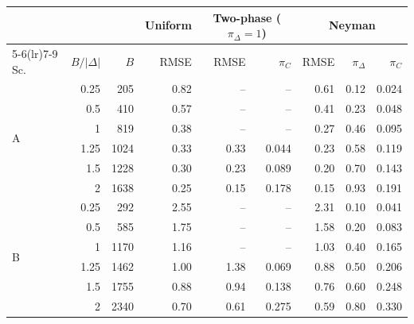 \begin{tabular}{lrrrrrrrr}
\toprule
 & & & Uniform & \multicolumn{2}{c}{Two-phase ($\pi_\Delta=1$)} & \multicolumn{3}{c}{Neyman} \\
\cmidrule(lr){5-6}\cmidrule(lr){7-9}
Sc. & $B/|\Delta|$ & $B$ & RMSE & RMSE & $\pi_C$ & RMSE & $\pi_\Delta$ & $\pi_C$ \\
\midrule
\multirow{6}{*}{A} & 0.25 & 205 & 0.82 & -- & -- & 0.61 & 0.12 & 0.024 \\
 & 0.5 & 410 & 0.57 & -- & -- & 0.41 & 0.23 & 0.048 \\
 & 1 & 819 & 0.38 & -- & -- & 0.27 & 0.46 & 0.095 \\
 & 1.25 & 1024 & 0.33 & 0.33 & 0.044 & 0.23 & 0.58 & 0.119 \\
 & 1.5 & 1228 & 0.30 & 0.23 & 0.089 & 0.20 & 0.70 & 0.143 \\
 & 2 & 1638 & 0.25 & 0.15 & 0.178 & 0.15 & 0.93 & 0.191 \\
\midrule
\multirow{6}{*}{B} & 0.25 & 292 & 2.55 & -- & -- & 2.31 & 0.10 & 0.041 \\
 & 0.5 & 585 & 1.75 & -- & -- & 1.58 & 0.20 & 0.083 \\
 & 1 & 1170 & 1.16 & -- & -- & 1.03 & 0.40 & 0.165 \\
 & 1.25 & 1462 & 1.00 & 1.38 & 0.069 & 0.88 & 0.50 & 0.206 \\
 & 1.5 & 1755 & 0.88 & 0.94 & 0.138 & 0.76 & 0.60 & 0.248 \\
 & 2 & 2340 & 0.70 & 0.61 & 0.275 & 0.59 & 0.80 & 0.330 \\
\bottomrule
\end{tabular}

